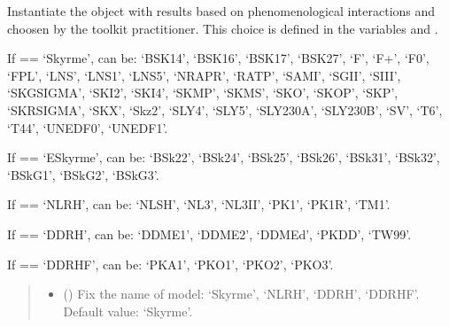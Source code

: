 \documentclass[letterpaper,10pt,english]{sphinxmanual}
\begin{document}
\begin{fulllineitems}
\label{\detokenize{source/api/setup_matter_pheno:nucleardatapy.matter.setup_pheno.setupPheno}}
\pysigstartsignatures
{}
\pysigstopsignatures
\sphinxAtStartPar
Instantiate the object with results based on phenomenological    interactions and choosen by the toolkit practitioner.     This choice is defined in the variables  and .

\sphinxAtStartPar
If  == ‘Skyrme’,  can be: ‘BSK14’,     ‘BSK16’, ‘BSK17’, ‘BSK27’, ‘F\sphinxhyphen{}’, ‘F+’, ‘F0’, ‘FPL’, ‘LNS’, ‘LNS1’, ‘LNS5’,     ‘NRAPR’, ‘RATP’, ‘SAMI’, ‘SGII’, ‘SIII’, ‘SKGSIGMA’, ‘SKI2’, ‘SKI4’, ‘SKMP’,     ‘SKMS’, ‘SKO’, ‘SKOP’, ‘SKP’, ‘SKRSIGMA’, ‘SKX’, ‘Skz2’, ‘SLY4’, ‘SLY5’,     ‘SLY230A’, ‘SLY230B’, ‘SV’, ‘T6’, ‘T44’, ‘UNEDF0’, ‘UNEDF1’.

\sphinxAtStartPar
If  == ‘ESkyrme’,  can be: ‘BSk22’, ‘BSk24’, ‘BSk25’,     ‘BSk26’, ‘BSk31’, ‘BSk32’, ‘BSkG1’, ‘BSkG2’, ‘BSkG3’.

\sphinxAtStartPar
If  == ‘NLRH’,  can be: ‘NL\sphinxhyphen{}SH’, ‘NL3’, ‘NL3II’, ‘PK1’, ‘PK1R’, ‘TM1’.

\sphinxAtStartPar
If  == ‘DDRH’,  can be: ‘DDME1’, ‘DDME2’, ‘DDMEd’, ‘PKDD’, ‘TW99’.

\sphinxAtStartPar
If  == ‘DDRHF’,  can be: ‘PKA1’, ‘PKO1’, ‘PKO2’, ‘PKO3’.
\begin{quote}\begin{description}
\begin{itemize}
\item {} 
\sphinxAtStartPar
{} (\sphinxstyleliteralemphasis{\sphinxupquote{, }}) \textendash{} Fix the name of model: ‘Skyrme’, ‘NLRH’,     ‘DDRH’, ‘DDRHF’. Default value: ‘Skyrme’.


\end{itemize}
\end{description}
\end{quote}
\end{fulllineitems}
\end{document}
